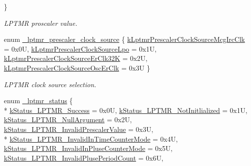 \begin{DoxyCompactItemize}
 \}\begin{DoxyCompactList}\small\item\em L\+P\+T\+MR proscaler value. \end{DoxyCompactList}
\item 
enum \hyperlink{group__lptmr__hal_ga8dd7b1ea8d5d91a6ff3b167d85e54acf}{\+\_\+lptmr\+\_\+prescaler\+\_\+clock\+\_\+source} \{ \hyperlink{group__lptmr__hal_gga8dd7b1ea8d5d91a6ff3b167d85e54acfa893c139278455d233fa413910e9789a9}{k\+Lptmr\+Prescaler\+Clock\+Source\+Mcg\+Irc\+Clk} = 0x0U, 
\hyperlink{group__lptmr__hal_gga8dd7b1ea8d5d91a6ff3b167d85e54acfa9bd430c5bb650fae9f8f10d8fe9b9ac7}{k\+Lptmr\+Prescaler\+Clock\+Source\+Lpo} = 0x1U, 
\hyperlink{group__lptmr__hal_gga8dd7b1ea8d5d91a6ff3b167d85e54acfa036d1c9b655894cdc8f785e0b12d0072}{k\+Lptmr\+Prescaler\+Clock\+Source\+Er\+Clk32K} = 0x2U, 
\hyperlink{group__lptmr__hal_gga8dd7b1ea8d5d91a6ff3b167d85e54acfa2956c6209685c53152781226c055e100}{k\+Lptmr\+Prescaler\+Clock\+Source\+Osc\+Er\+Clk} = 0x3U
 \}\begin{DoxyCompactList}\small\item\em L\+P\+T\+MR clock source selection. \end{DoxyCompactList}
\item 
enum \hyperlink{group__lptmr__hal_gaa52fc547656e966381f441688c605210}{\+\_\+lptmr\+\_\+status} \{ \\*
\hyperlink{group__lptmr__hal_ggaa52fc547656e966381f441688c605210a268cfb8a15550d941c98b7390ea0274f}{k\+Status\+\_\+\+L\+P\+T\+M\+R\+\_\+\+Success} = 0x0U, 
\hyperlink{group__lptmr__hal_ggaa52fc547656e966381f441688c605210a3869955655e682f2cd787e210ad07e64}{k\+Status\+\_\+\+L\+P\+T\+M\+R\+\_\+\+Not\+Initlialized} = 0x1U, 
\hyperlink{group__lptmr__hal_ggaa52fc547656e966381f441688c605210ade8cb5b3c0095aaf70032452582f28a8}{k\+Status\+\_\+\+L\+P\+T\+M\+R\+\_\+\+Null\+Argument} = 0x2U, 
\hyperlink{group__lptmr__hal_ggaa52fc547656e966381f441688c605210a4782bb1ccc8f952ae9adf9817e0f7369}{k\+Status\+\_\+\+L\+P\+T\+M\+R\+\_\+\+Invalid\+Prescaler\+Value} = 0x3U, 
\\*
\hyperlink{group__lptmr__hal_ggaa52fc547656e966381f441688c605210a96b6d93c0a9210f90d4d1b6dcec2e3b5}{k\+Status\+\_\+\+L\+P\+T\+M\+R\+\_\+\+Invalid\+In\+Time\+Counter\+Mode} = 0x4U, 
\hyperlink{group__lptmr__hal_ggaa52fc547656e966381f441688c605210a96312ee626ca3799a1fd70ee152c9d50}{k\+Status\+\_\+\+L\+P\+T\+M\+R\+\_\+\+Invalid\+In\+Pluse\+Counter\+Mode} = 0x5U, 
\hyperlink{group__lptmr__hal_ggaa52fc547656e966381f441688c605210acabcc25a84885bfaed9db6d20c0408d5}{k\+Status\+\_\+\+L\+P\+T\+M\+R\+\_\+\+Invalid\+Pluse\+Period\+Count} = 0x6U, 

\end{DoxyCompactItemize}
